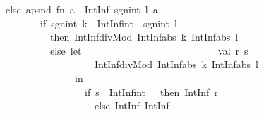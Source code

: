 \begin{isabellebody}
\begin{isamarkuptext}
\ \ \ \ \ \ \ \ \ \ \ else\ apsnd\ {}fn\ a\ {}{}\ IntInf{}{}\ {}sgn{}int\ l{}\ a{}{}\isanewline
\ \ \ \ \ \ \ \ \ \ \ \ \ \ \ \ \ \ {}if\ {}{}{}sgn{}int\ k{}\ {}\ IntInf{}int{}\ {}\ {}sgn{}int\ l{}{}\isanewline
\ \ \ \ \ \ \ \ \ \ \ \ \ \ \ \ \ \ \ \ then\ IntInf{}divMod\ {}IntInf{}abs\ k{}\ IntInf{}abs\ l{}\isanewline
\ \ \ \ \ \ \ \ \ \ \ \ \ \ \ \ \ \ \ \ else\ let\isanewline
\ \ \ \ \ \ \ \ \ \ \ \ \ \ \ \ \ \ \ \ \ \ \ \ \ \ \ val\ {}r{}\ s{}\ {}\isanewline
\ \ \ \ \ \ \ \ \ \ \ \ \ \ \ \ \ \ \ \ \ \ \ \ \ \ \ \ \ IntInf{}divMod\ {}IntInf{}abs\ k{}\ IntInf{}abs\ l{}{}\isanewline
\ \ \ \ \ \ \ \ \ \ \ \ \ \ \ \ \ \ \ \ \ \ \ \ \ in\isanewline
\ \ \ \ \ \ \ \ \ \ \ \ \ \ \ \ \ \ \ \ \ \ \ \ \ \ \ {}if\ {}{}s\ {}\ IntInf{}int{}\ {}\ {}{}\ then\ {}IntInf{}{}\ r{}\ {}{}\isanewline
\ \ \ \ \ \ \ \ \ \ \ \ \ \ \ \ \ \ \ \ \ \ \ \ \ \ \ \ \ else\ {}IntInf{}{}\ {}IntInf{}{}\isanewline

\end{isamarkuptext}
\end{isabellebody}
